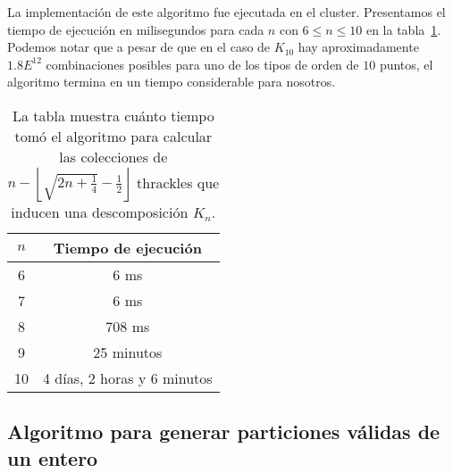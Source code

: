   La implementación de este algoritmo fue ejecutada en el cluster. Presentamos el tiempo
  de ejecución en milisegundos para cada $n$ con $6\leq n \leq 10$ en la
  tabla~\ref{tabla:tiempo_thrackles_maximos}. Podemos notar que a pesar de que en el caso
  de $K_{10}$ hay aproximadamente $1.8E^{12}$ combinaciones posibles para uno de los
  tipos de orden de $10$ puntos, el algoritmo termina en un tiempo considerable para
  nosotros.
  \begin{table}
    \centering
    \begin{tabular}{|c|c|}
      \hline
      $n$ & Tiempo de ejecución \\ \hline \hline
      6   & 6 ms \\ \hline
      7   & 6 ms \\ \hline
      8   & 708 ms \\ \hline
      9   & 25 minutos \\ \hline
      10  & 4 días, 2 horas y 6 minutos \\ \hline
    \end{tabular}
    \caption{La tabla muestra cuánto tiempo tomó el algoritmo para calcular las colecciones de $n -
    \left\lfloor\sqrt{2n + \frac{1}{4}} - \frac{1}{2}\right\rfloor$ thrackles que inducen una descomposición $K_n$.}
    \label{tabla:tiempo_thrackles_maximos}
  \end{table}

  \subsection{Algoritmo para generar particiones válidas de un
  entero}\label{secc:algo_particiones_validas}

